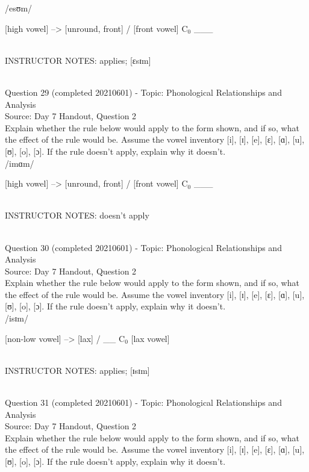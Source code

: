 \documentclass[12pt]{article}
\begin{document}
/esʊm/

{[high vowel]} --> {[unround, front]} / {[front vowel]} C$_0$ ___


~\\
INSTRUCTOR NOTES: applies; [ɛsɪm]


~\\

{\large Question 29} (completed 20210601) - Topic: Phonological Relationships and Analysis\\
Source: Day 7 Handout, Question 2\\

Explain whether the rule below would apply to the form shown, and if so, what the effect of the rule would be. Assume the vowel inventory [i], [ɪ], [e], [ɛ], [ɑ], [u], [ʊ], [o], [ɔ]. If the rule doesn't apply, explain why it doesn't.\\

/imɑm/

{[high vowel]} --> {[unround, front]} / {[front vowel]} C$_0$ ___


~\\
INSTRUCTOR NOTES: doesn't apply


~\\

{\large Question 30} (completed 20210601) - Topic: Phonological Relationships and Analysis\\
Source: Day 7 Handout, Question 2\\

Explain whether the rule below would apply to the form shown, and if so, what the effect of the rule would be. Assume the vowel inventory [i], [ɪ], [e], [ɛ], [ɑ], [u], [ʊ], [o], [ɔ]. If the rule doesn't apply, explain why it doesn't.\\

/isɪm/

{[non-low vowel]} --> {[lax]} / __ C$_0$ {[lax vowel]}


~\\
INSTRUCTOR NOTES: applies; [ɪsɪm]


~\\

{\large Question 31} (completed 20210601) - Topic: Phonological Relationships and Analysis\\
Source: Day 7 Handout, Question 2\\

Explain whether the rule below would apply to the form shown, and if so, what the effect of the rule would be. Assume the vowel inventory [i], [ɪ], [e], [ɛ], [ɑ], [u], [ʊ], [o], [ɔ]. If the rule doesn't apply, explain why it doesn't.\\
\end{document}

